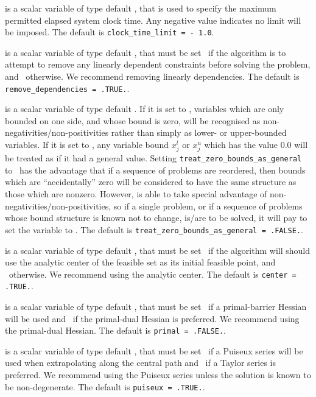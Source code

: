 \begin{description}
 is a scalar variable of type default \realdp,
that is used to specify the maximum permitted elapsed system clock time.
Any negative value indicates no limit will be imposed. The default is
{\tt clock\_time\_limit = - 1.0}.

 is a scalar variable of type
default \logical, that must be set \true\ if the algorithm
is to attempt to remove any linearly dependent constraints before
solving the problem, and \false\ otherwise.
We recommend removing linearly dependencies.
The default is {\tt remove\_dependencies = .TRUE.}.

 is a scalar variable of type
default \logical.
If it is set to \false, variables which
are only bounded on one side, and whose bound is zero,
will be recognised as non-negativities/non-positivities rather than simply as
lower- or upper-bounded variables.
If it is set to \true, any variable bound
$x_{j}^{l}$ or $x_{j}^{u}$ which has the value 0.0 will be
treated as if it had a general value.
Setting {\tt treat\_zero\_bounds\_as\_general} to \true\ has the advantage
that if a sequence of problems are reordered, then bounds which are
``accidentally'' zero will be considered to have the same structure as
those which are nonzero. However, {\tt \fullpackagename} is
able to take special advantage of non-negativities/non-positivities, so
if a single problem, or if a sequence of problems whose
bound structure is known not to change, is/are to be solved,
it will pay to set the variable to \false.
The default is {\tt treat\_zero\_bounds\_as\_general = .FALSE.}.

 is a scalar variable of type default \logical, that
must be set \true\
if the algorithm will should use the analytic center
of the feasible set as its initial feasible point,
and \false\ otherwise.
We recommend using the analytic center.
The default is {\tt center = .TRUE.}.

 is a scalar variable of type default \logical, that
must be set \true\
if a primal-barrier Hessian will be used
and \false\ if the primal-dual Hessian is preferred.
We recommend using the primal-dual Hessian.
The default is {\tt primal = .FALSE.}.

 is a scalar variable of type default \logical, that
must be set \true\
if a Puiseux series will be used when extrapolating along the central path
and \false\ if a Taylor series is preferred.
We recommend using the Puiseux series unless the solution is known
to be non-degenerate.
The default is {\tt puiseux = .TRUE.}.


\end{description}
